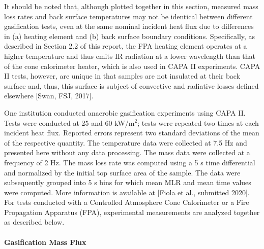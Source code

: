 \documentclass{book}
\begin{document}
It should be noted that, although plotted together in this section, measured mass loss rates and back surface temperatures may not be identical between different gasification tests, even at the same nominal incident heat flux due to differences in (a) heating element and (b) back surface boundary conditions. Specifically, as described in Section 2.2 of this report, the FPA heating element operates at a higher temperature and thus emits IR radiation at a lower wavelength than that of the cone calorimeter heater, which is also used in CAPA II experiments. CAPA II tests, however, are unique in that samples are not insulated at their back surface and, thus, this surface is subject of convective and radiative losses defined elsewhere [Swan, FSJ, 2017].

One institution conducted anaerobic gasification experiments using CAPA II. Tests were conducted at 25 and 60 kW/m$^2$; tests were repeated two times at each incident heat flux. Reported errors represent two standard deviations of the mean of the respective quantity. The temperature data were collected at 7.5 Hz and presented here without any data processing. The mass data were collected at a frequency of 2 Hz. The mass loss rate was computed using a 5 s time differential and normalized by the initial top surface area of the sample. The data were subsequently grouped into 5 s bins for which mean MLR and mean time values were computed. More information is available at [Fiola et al., submitted 2020]. For tests conducted with a Controlled Atmosphere Cone Calorimeter or a Fire Propagation Apparatus (FPA), experimental measurements are analyzed together as described below.

\paragraph{Gasification Mass Flux}
\end{document}
